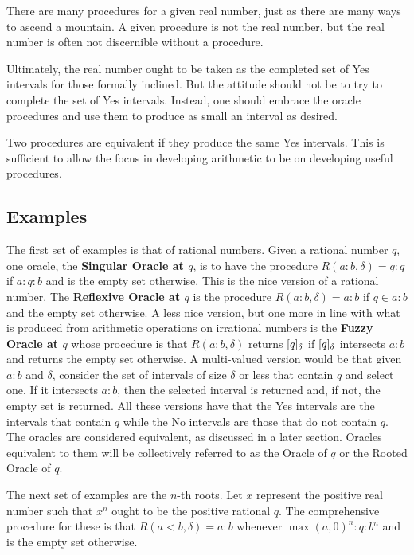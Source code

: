 \documentclass[12pt]{article}
\begin{document}
There are many procedures for a given real number, just as there are many ways to ascend a mountain. A given procedure is not the real number, but the real number is often not discernible without a procedure. 

Ultimately, the real number ought to be taken as the completed set of Yes intervals for those formally inclined. But the attitude should not be to try to complete the set of Yes intervals. Instead, one should embrace the oracle procedures and use them to produce as small an interval as desired. 

Two procedures are equivalent if they produce the same Yes intervals. This is sufficient to allow the focus in developing arithmetic to be on developing useful procedures. 

\subsection{Examples}

The first set of examples is that of rational numbers. Given a rational number $q$, one oracle, the \textbf{Singular Oracle at $q$}, is to have the procedure $R(a:b, \delta) = q:q$ if $a:q:b$ and is the empty set otherwise. This is the nice version of a rational number. The \textbf{Reflexive Oracle at $q$} is the procedure $R(a:b, \delta) = a:b$ if $q \in a:b$ and the empty set otherwise. A less nice version, but one more in line with what is produced from arithmetic operations on irrational numbers is the \textbf{Fuzzy Oracle at $q$} whose procedure is that $R(a:b, \delta)$ returns $[q]_{\delta}$ if $[q]_{\delta}$ intersects $a:b$ and returns the empty set otherwise. A multi-valued version would be that given $a:b$ and $\delta$, consider the set of intervals of size $\delta$ or less that contain $q$ and select one. If it intersects $a:b$, then the selected interval is returned and, if not, the empty set is returned. All these versions have that the Yes intervals are the intervals that contain $q$ while the No intervals are those that do not contain $q$. The oracles are considered equivalent, as discussed in a later section. Oracles equivalent to them will be collectively referred to as the Oracle of $q$ or the Rooted Oracle of $q$.  

The next set of examples are the $n$-th roots. Let $x$ represent the positive real number such that $x^n$ ought to be the positive rational $q$. The comprehensive procedure for these is that $R(a\lt b, \delta) = a:b$ whenever $\max(a, 0)^n:q:b^n$ and is the empty set otherwise.
\end{document}
